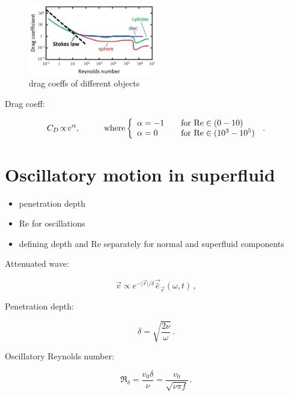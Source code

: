\begin{figure}[h]
	\centering
	\includegraphics[width=0.5\textwidth]{graphics/theory/C-Re}
	\caption{drag coeffs of different objects}
	\label{C-Re}
\end{figure}

Drag coeff:

$$
C_D \!\propto\! v^\alpha, \hspace{1cm}
\text{where}
\left\{
  \begin{array}{l l}
    \alpha=-1 & \quad \text{for $\Re \in (0-10)$}\\
    \alpha=0 & \quad \text{for $\Re \in (10^3-10^5)$}
  \end{array}
\right.\,.
$$


\section{Oscillatory motion in superfluid}
\begin{itemize}
	\item penetration depth
	\item Re for oscillations
	\item defining depth and Re separately for normal and superfluid components
\end{itemize}

Attenuated wave:

\begin{equation}
\vec{v} \propto e^{-\vert\vec{r}\vert/\delta} \vec{\hat{e}}_{\vec{r}}(\omega, t)\,,
\label{v_pen}
\end{equation}

Penetration depth:

\begin{equation}
\delta = \sqrt{\frac{2\nu}{\omega}}\,.
\label{penetration}
\end{equation}

Oscillatory Reynolds number:

\begin{equation}
\Re_{\delta} = \frac{v_0 \delta}{\nu} = \frac{v_0}{\sqrt{\nu \pi f}} \,.
\label{Re*}
\end{equation}


